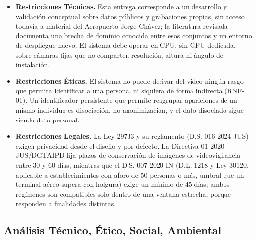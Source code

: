 \begin{itemize}
  \item \textbf{Restricciones Técnicas.} Esta entrega corresponde a un desarrollo y validación
  conceptual sobre datos públicos y grabaciones propias, sin acceso todavía a material
  del Aeropuerto Jorge Chávez; la literatura revisada documenta una brecha de dominio
  conocida entre esos conjuntos y un entorno de despliegue nuevo. El sistema debe
  operar en CPU, sin GPU dedicada, sobre cámaras fijas que no comparten resolución,
  altura ni ángulo de instalación.
  \item \textbf{Restricciones Éticas.} El sistema no puede derivar del video ningún rasgo que
  permita identificar a una persona, ni siquiera de forma indirecta (RNF-01). Un
  identificador persistente que permite reagrupar apariciones de un mismo individuo es
  disociación, no anonimización, y el dato disociado sigue siendo dato personal.
  \item \textbf{Restricciones Legales.} La Ley 29733 y su reglamento (D.S. 016-2024-JUS)
  exigen privacidad desde el diseño y por defecto. La Directiva 01-2020-JUS/DGTAIPD
  fija plazos de conservación de imágenes de videovigilancia entre 30 y 60 días,
  mientras que el D.S. 007-2020-IN (D.L. 1218 y Ley 30120, aplicable a
  establecimientos con aforo de 50 personas o más, umbral que un terminal aéreo
  supera con holgura) exige un mínimo de 45 días; ambos regímenes son compatibles
  solo dentro de una ventana estrecha, porque responden a finalidades distintas.
\end{itemize}

\subsection{Análisis Técnico, Ético, Social, Ambiental}
\label{subsec:analisis-teas}

